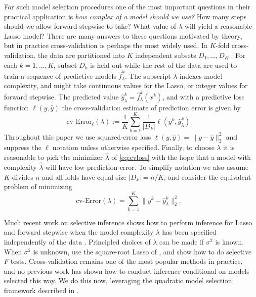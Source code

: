 \documentclass[preprint]{imsart}
\begin{document}
For such model selection procedures one of the most important
questions in their practical application is {\em how complex of a
  model should we use?} How many steps should we allow forward
stepwise to take? What value of $\lambda$ will yield a reasonable
Lasso model? There are many answers to these questions motivated by
theory, but in practice cross-validation is perhaps the most widely
used. In $K$-fold cross-validation, the data are partitioned into $K$
independent subsets $D_1, \ldots, D_K$.. For each $k = 1,\ldots,K$,
subset $D_k$ is held out while the rest of the data are used to train
a sequence of predictive models $\hat f^k_\lambda$. The subscript
$\lambda$ indexes model complexity, and might take continuous values
for the Lasso, or integer values for forward stepwise. The predicted
value $\hat y^k_\lambda = \hat f^k_\lambda(x^k)$, and with a
predictive loss function $\ell(y, \hat y)$ the cross-validation
estimate of prediction error is given by 
\begin{equation}
  \label{eq:cvloss}
 \text{cv-Error}_{\ell}(\lambda) :=  \frac{1}{K} \sum_{k=1}^K
 \frac{1}{|D_k|} \ell (y^k, \hat y^k_\lambda) 
\end{equation}
Throughout this paper we use squared-error loss $\ell (y, \hat y)
= \|y - \hat y\|_2^2$ and suppress the $\ell$ notation unless
otherwise specified. Finally, to choose $\lambda$ it is reasonable to
pick the minimizer $\hat \lambda$ of \eqref{eq:cvloss} with the hope
that a model with complexity $\hat \lambda$ will have low prediction
error. To simplify notation we also assume $K$ divides $n$ and all
folds have equal size $|D_k| = n/K$, and consider the equivalent
problem of minimizing
\begin{equation}
  \label{eq:cvlosssimplified}
  \text{cv-Error}(\lambda) = \sum_{k=1}^K \| y^k - \hat y_\lambda^k \|_2^2.
\end{equation}

Much recent work on selective inference shows how to perform inference
for Lasso and forward stepwise when the model complexity $\lambda$ has
been specified independently of the data \cite{lee2013exact,
  taylor2013tests, tibshirani2014exact}. Principled choices of
$\lambda$ can be made if $\sigma^2$ is known. When $\sigma^2$ is
unknown, \cite{tian2015sqrtlasso} use the square-root Lasso of
\cite{sqrtlasso}, and \cite{gross2015internal, loftus2015groups} show
how to do selective $F$ tests. Cross-validation remains one of the
most popular methods in practice, and no previous work has shown how
to conduct inference conditional on models selected this way. We do
this now, leveraging the quadratic model selection framework described
in \cite{loftus2015groups}. 
\end{document}
